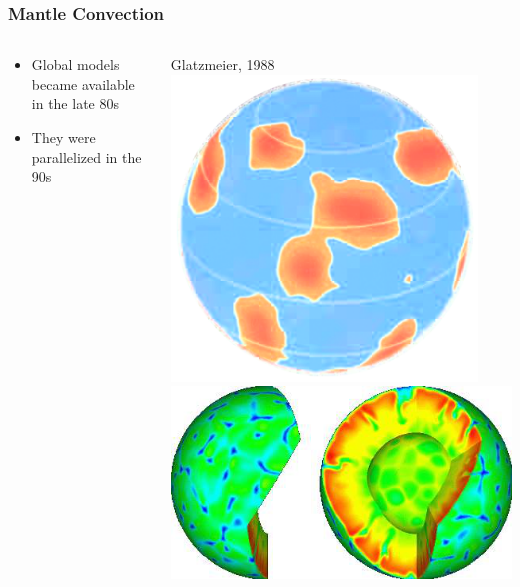 \documentclass[t,compress=false,usepdftitle=false]{beamer}
\begin{document}
\begin{frame}\frametitle{Mantle Convection}
\begin{columns}
\hspace*{-8mm}
\vspace{6mm}
\begin{myColorBox}{.8}{}\color{linkcolor}
\centering
\begin{itemize}
 \item Global models became available in the late 80s
 \item They were parallelized in the 90s
\end{itemize}
\end{myColorBox}
\vspace{-5mm}
\begin{columns}
Glatzmeier, 1988\\
\includegraphics[width=0.9\textwidth]{glatzmeier88.png}\\
\vspace{2mm}
\hspace*{-4mm}\includegraphics[width=1.1\textwidth]{bunge.png}\\

\end{columns}
\end{columns}
\end{frame}
\end{document}

